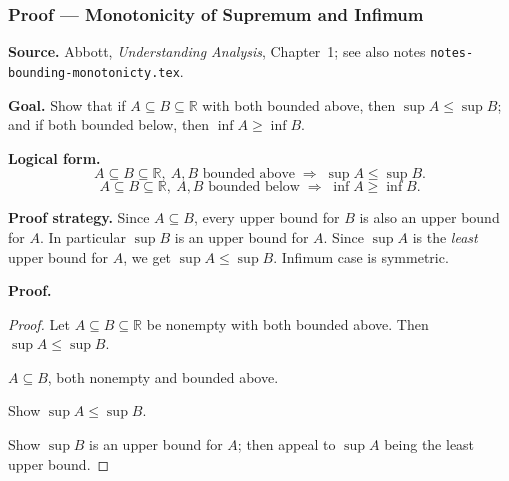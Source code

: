 
\clearpage
{}
\hypertarget{proof-RA-ABB-P-monotonicity-sup-inf}{}

\subsubsection[Monotonicity of Supremum and Infimum]{Proof --- Monotonicity of Supremum and Infimum}

\bigskip

\noindent
\textbf{Source.}
Abbott, \emph{Understanding Analysis}, Chapter~1; see also notes
\texttt{notes-bounding-monotonicty.tex}.

\vspace{0.75em}

\noindent
\textbf{Goal.}
Show that if $A \subseteq B \subseteq \mathbb{R}$ with both bounded above,
then $\sup A \le \sup B$; and if both bounded below, then $\inf A \ge \inf B$.

\vspace{0.75em}

\noindent
\textbf{Logical form.}
\[
  A \subseteq B \subseteq \mathbb{R},\ A,B \text{ bounded above}
  \;\Rightarrow\;
  \sup A \le \sup B.
\]
\[
  A \subseteq B \subseteq \mathbb{R},\ A,B \text{ bounded below}
  \;\Rightarrow\;
  \inf A \ge \inf B.
\]

\vspace{0.75em}

\noindent
\textbf{Proof strategy.}
Since $A \subseteq B$, every upper bound for $B$ is also an upper bound for
$A$. In particular $\sup B$ is an upper bound for $A$. Since $\sup A$ is
the \emph{least} upper bound for $A$, we get $\sup A \le \sup B$.
Infimum case is symmetric.

\vspace{0.75em}

\noindent
\textbf{Proof.}
\begin{proof}
\Claim Let $A \subseteq B \subseteq \mathbb{R}$ be nonempty with both bounded
above. Then $\sup A \le \sup B$.

\Given $A \subseteq B$, both nonempty and bounded above.

\Goal Show $\sup A \le \sup B$.

\Strategy Show $\sup B$ is an upper bound for $A$; then appeal to $\sup A$
being the least upper bound.

\medskip


\medskip

\end{proof}

